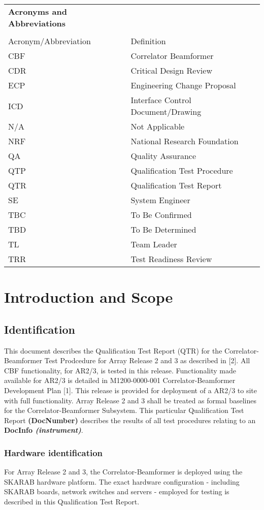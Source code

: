 \begin{longtable}{ll}
	{\bf\LARGE Acronyms and Abbreviations} & \\\\
	Acronym/Abbreviation & Definition \\
	CBF & Correlator Beamformer \\
	CDR & Critical Design Review \\
	ECP & Engineering Change Proposal \\
	ICD & Interface Control Document/Drawing \\
	N/A & Not Applicable \\
	NRF & National Research Foundation \\
	QA  & Quality Assurance \\
	QTP & Qualification Test Procedure \\
	QTR & Qualification Test Report \\
	SE  & System Engineer \\
	TBC & To Be Confirmed \\
	TBD & To Be Determined \\
	TL  & Team Leader \\
	TRR & Test Readiness Review \\
\end{longtable}

\chapter{Introduction and Scope}
\section{Identification}
This document describes the Qualification Test Report (QTR) for the Correlator-Beamformer Test Prodcedure for Array Release 2 and 3 as described in [2].\newline
All CBF functionality, for AR2/3, is tested in this release. Functionality made available for AR2/3 is detailed in M1200-0000-001 Correlator-Beamformer Development Plan [1]. This release is provided for deployment of a AR2/3 to site with full functionality. Array Release 2 and 3 shall be treated as formal baselines for the Correlator-Beamformer Subsystem.\newline 
This particular Qualification Test Report {\bf (DocNumber)} describes the results of all test procedures relating to an {\bf DocInfo \it{(instrument)}}.
\subsection{Hardware identification}
For Array Release 2 and 3, the Correlator-Beamformer is deployed using the SKARAB hardware platform. The exact hardware configuration - including SKARAB boards, network switches and servers - employed for testing is described in this Qualification Test Report.
